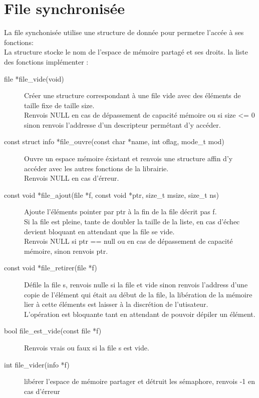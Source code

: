 \documentclass[12pt]{article}
\begin{document}
\section{File synchronisée}
    La file synchonisée utilise une structure de donnée pour permetre l'accée à ses fonctions:\\
    La structure stocke le nom de l'espace de mémoire partagé et ses droits.
    la liste des fonctions implémenter :
    \begin{description}
        \item [file *file\_vide(void)] Créer une structure correspondant à une file vide avec des éléments de taille
        fixe de taille size.\\
        Renvois NULL en cas de dépassement de capacité mémoire ou si size <= 0\\
        sinon renvois l'addresse d'un descripteur permétant d'y accéder.
        
        \item [const struct info *file\_ouvre(const char *name, int oflag, mode\_t mod)] Ouvre un espace mémoire éxistant et renvois une structure affin d'y accéder avec les autres fonctions de la librairie.\\
        Renvois NULL en cas d'érreur.
        
        \item [const void *file\_ajout(file *f, const void *ptr, size\_t msize, size\_t ns)]  Ajoute l'éléments pointer par ptr à la fin de la file décrit pas f.\\
        Si la file est pleine, tante de doubler la taille de la liste, en cas d'échec
        devient bloquant en attendant que la file se vide.\\
        Renvois NULL si ptr == null ou en cas de dépassement de capacité mémoire, sinon renvois ptr.
        
        \item [const void *file\_retirer(file *f)] Défile la file s, renvois nulle si la file et vide sinon renvois l'address d'une copie de l'élément qui était au début de la file, la libération de la mémoire lier à cette éléments est laisser à la discrétion de l'utisateur.\\
        L'opération est bloquante tant en attendant de pouvoir dépiler un élément.
        
        \item [bool file\_est\_vide(const file *f)] Renvois vrais ou faux si la file s est vide.
        
        \item [int file\_vider(info *f)] libérer l'espace de mémoire partager et détruit les sémaphore, renvois -1 en cas d'érreur
    \end{description}
\end{document}
